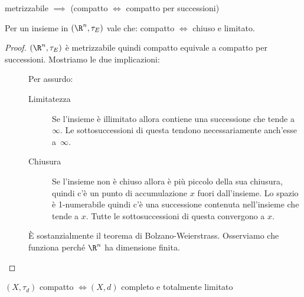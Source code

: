 \begin{cor}
	metrizzabile $\implies$ (compatto $\iff$ compatto per successioni)
\end{cor}

\begin{prop}
	Per un insieme in $(\R^n,\tau_E)$ vale che: compatto $\iff$ chiuso e limitato.
\end{prop}

\begin{proof}
	$(\R^n,\tau_E)$ è metrizzabile quindi compatto equivale a compatto per successioni.
	Mostriamo le due implicazioni:
	\begin{description}
		\item[\proofrightarrow]
			Per assurdo:
			\begin{description}
				\item[Limitatezza]
				Se l'insieme è illimitato allora contiene una successione che tende a~$\infty$.
				Le sottosuccessioni di questa tendono necessariamente anch'esse a~$\infty$.
				\item[Chiusura]
				Se l'insieme non è chiuso allora è più piccolo della sua chiusura,
				quindi c'è un punto di accumulazione $x$ fuori dall'insieme.
				Lo spazio è \mbox{1-numerabile}
				quindi c'è una successione contenuta nell'insieme che tende a $x$.
				Tutte le sottosuccessioni di questa convergono a $x$.
			\end{description}
		\item[\proofleftarrow]
			È sostanzialmente il teorema di Bolzano-Weierstrass.
			Osserviamo che funziona perché $\R^n$ ha dimensione finita.
		\qedhere
	\end{description}
\end{proof}

\begin{ex}
	$(X,\tau _d)$ compatto $\iff (X,d)$ completo e totalmente limitato
\end{ex}

